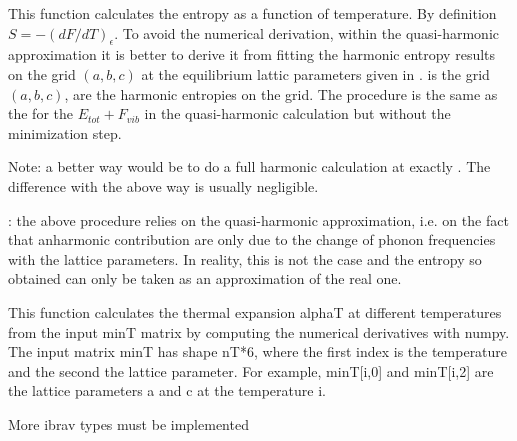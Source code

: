 \documentclass[letterpaper,10pt,english]{sphinxmanual}
\begin{document}
\begin{fulllineitems}
\label{pyqha:pyqha.properties_anis.compute_S}
This function calculates the entropy as a function of temperature. By definition
\(S = -(dF/dT)_{\epsilon}\). To avoid the numerical derivation, within the quasi-harmonic
approximation it is better to derive it from fitting the harmonic entropy
results on the grid \((a,b,c)\) at the equilibrium lattic parameters given
in .  is the grid \((a,b,c)\),  are the harmonic 
entropies on the grid.
The procedure is the same as the for the \(E_{tot}+F_{vib}\) in the quasi-harmonic
calculation but without the minimization step.

Note: a better way would be to do a full harmonic calculation at exactly .
The difference with the above way is usually negligible.

: the above procedure relies on the quasi-harmonic approximation,
i.e. on the fact that anharmonic contribution are only due to the change of
phonon frequencies with the lattice parameters. In reality, this is not the 
case and the entropy so obtained can only be taken as an approximation of the
real one.

\end{fulllineitems}


\begin{fulllineitems}
\label{pyqha:pyqha.properties_anis.compute_alpha}
This function calculates the thermal expansion alphaT at different temperatures
from the input minT matrix by computing the numerical derivatives with numpy.
The input matrix minT has shape nT*6, where the first index is the temperature 
and the second the lattice parameter. For example, minT{[}i,0{]} and minT{[}i,2{]} are
the lattice parameters a and c at the temperature i.

More ibrav types must be implemented

\end{fulllineitems}

\end{document}
